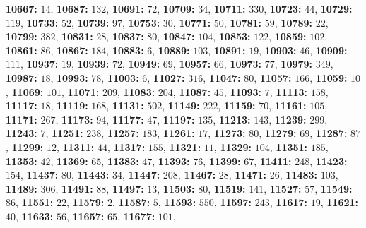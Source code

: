 \textsf{\bfseries 10667:} $14$, \textsf{\bfseries 10687:} $132$, \textsf{\bfseries 10691:} $72$, \textsf{\bfseries 10709:} $34$, \textsf{\bfseries 10711:} $330$, \textsf{\bfseries 10723:} $44$, \textsf{\bfseries 10729:} $119$, \textsf{\bfseries 10733:} $52$, \textsf{\bfseries 10739:} $97$, \textsf{\bfseries 10753:} $30$, \textsf{\bfseries 10771:} $50$, \textsf{\bfseries 10781:} $59$, \textsf{\bfseries 10789:} $22$, \textsf{\bfseries 10799:} $382$, \textsf{\bfseries 10831:} $28$, \textsf{\bfseries 10837:} $80$, \textsf{\bfseries 10847:} $104$, \textsf{\bfseries 10853:} $122$, \textsf{\bfseries 10859:} $102$, \textsf{\bfseries 10861:} $86$, \textsf{\bfseries 10867:} $184$, \textsf{\bfseries 10883:} $6$, \textsf{\bfseries 10889:} $103$, \textsf{\bfseries 10891:} $19$, \textsf{\bfseries 10903:} $46$, \textsf{\bfseries 10909:} $111$, \textsf{\bfseries 10937:} $19$, \textsf{\bfseries 10939:} $72$, \textsf{\bfseries 10949:} $69$, \textsf{\bfseries 10957:} $66$, \textsf{\bfseries 10973:} $77$, \textsf{\bfseries 10979:} $349$, \textsf{\bfseries 10987:} $18$, \textsf{\bfseries 10993:} $78$, \textsf{\bfseries 11003:} $6$, \textsf{\bfseries 11027:} $316$, \textsf{\bfseries 11047:} $80$, \textsf{\bfseries 11057:} $166$, \textsf{\bfseries 11059:} $10$, \textsf{\bfseries 11069:} $101$, \textsf{\bfseries 11071:} $209$, \textsf{\bfseries 11083:} $204$, \textsf{\bfseries 11087:} $45$, \textsf{\bfseries 11093:} $7$, \textsf{\bfseries 11113:} $158$, \textsf{\bfseries 11117:} $18$, \textsf{\bfseries 11119:} $168$, \textsf{\bfseries 11131:} $502$, \textsf{\bfseries 11149:} $222$, \textsf{\bfseries 11159:} $70$, \textsf{\bfseries 11161:} $105$, \textsf{\bfseries 11171:} $267$, \textsf{\bfseries 11173:} $94$, \textsf{\bfseries 11177:} $47$, \textsf{\bfseries 11197:} $135$, \textsf{\bfseries 11213:} $143$, \textsf{\bfseries 11239:} $299$, \textsf{\bfseries 11243:} $7$, \textsf{\bfseries 11251:} $238$, \textsf{\bfseries 11257:} $183$, \textsf{\bfseries 11261:} $17$, \textsf{\bfseries 11273:} $80$, \textsf{\bfseries 11279:} $69$, \textsf{\bfseries 11287:} $87$, \textsf{\bfseries 11299:} $12$, \textsf{\bfseries 11311:} $44$, \textsf{\bfseries 11317:} $155$, \textsf{\bfseries 11321:} $11$, \textsf{\bfseries 11329:} $104$, \textsf{\bfseries 11351:} $185$, \textsf{\bfseries 11353:} $42$, \textsf{\bfseries 11369:} $65$, \textsf{\bfseries 11383:} $47$, \textsf{\bfseries 11393:} $76$, \textsf{\bfseries 11399:} $67$, \textsf{\bfseries 11411:} $248$, \textsf{\bfseries 11423:} $154$, \textsf{\bfseries 11437:} $80$, \textsf{\bfseries 11443:} $34$, \textsf{\bfseries 11447:} $208$, \textsf{\bfseries 11467:} $28$, \textsf{\bfseries 11471:} $26$, \textsf{\bfseries 11483:} $103$, \textsf{\bfseries 11489:} $306$, \textsf{\bfseries 11491:} $88$, \textsf{\bfseries 11497:} $13$, \textsf{\bfseries 11503:} $80$, \textsf{\bfseries 11519:} $141$, \textsf{\bfseries 11527:} $57$, \textsf{\bfseries 11549:} $86$, \textsf{\bfseries 11551:} $22$, \textsf{\bfseries 11579:} $2$, \textsf{\bfseries 11587:} $5$, \textsf{\bfseries 11593:} $550$, \textsf{\bfseries 11597:} $243$, \textsf{\bfseries 11617:} $19$, \textsf{\bfseries 11621:} $40$, \textsf{\bfseries 11633:} $56$, \textsf{\bfseries 11657:} $65$, \textsf{\bfseries 11677:} $101$, 
